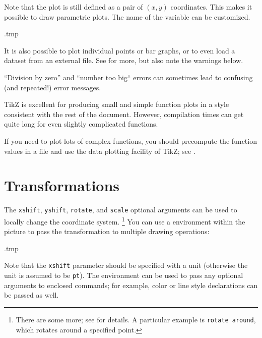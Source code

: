 Note that the plot is still defined as a pair of $(x,y)$ coordinates.
This makes it possible to draw parametric plots.
The name of the variable can be customized.
%
\begin{VerbatimOut}{\jobname.tmp}
\centering
{}
\end{VerbatimOut}
\ShowExampleBelow[2]

It is also possible to plot individual points or bar graphs,
or to even load a dataset from an external file.
See \cite[Section~22]{tikz} for more,
but also note the warnings below.

\begin{warning}
``Division by zero'' and ``number too big`` errors
can sometimes lead to confusing (and repeated!) error messages.
\end{warning}

\begin{practices}
TikZ is excellent for producing small and simple function plots
in a style consistent with the rest of the document.
However, compilation times can get quite long for even slightly complicated functions.

If you need to plot lots of complex functions,
you should precompute the function values in a file
and use the data plotting facility of TikZ; see \cite[Section~22]{tikz}.
\end{practices}



%
%
\section{Transformations}

The \verb|xshift|, \verb|yshift|, \verb|rotate|, and \verb|scale| optional arguments
can be used to locally change the coordinate system.%
\footnote{There are some more; see \cite[Section~25.3]{tikz} for details.
A particular example is \texttt{rotate around}, which rotates around a specified point.}
You can use a  environment within the picture
to pass the transformation to multiple drawing operations:
%
\begin{VerbatimOut}{\jobname.tmp}
\centering
{}
\end{VerbatimOut}
\ShowExampleBelow[2]
%
Note that the \verb|xshift| parameter should be specified with a unit
(otherwise the unit is assumed to be \verb|pt|).
The  environment can be used to pass any optional arguments to enclosed commands;
for example, color or line style declarations can be passed as well.

